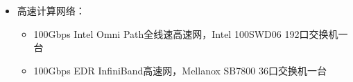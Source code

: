 \documentclass[a4paper,12pt,english]{sphinxmanual}
\begin{document}
\begin{itemize}
\begin{itemize}
\begin{itemize}
\begin{itemize}
\item {} 
\sphinxAtStartPar
64GB DDR4 2400MHz ECC REG内存

\item {} 
\sphinxAtStartPar
两块240GB SSD硬盘

\item {} 
\sphinxAtStartPar
一块100Gbps Intel OFI卡

\item {} 
\sphinxAtStartPar
一块56Gbps FDR InfiniBand卡

\end{itemize}

\end{itemize}

\item {} 
\sphinxAtStartPar
NFS普通IO节点：
\begin{itemize}
\item {} 
\sphinxAtStartPar
节点名：io5

\item {} 
\sphinxAtStartPar
曙光I620\sphinxhyphen{}G20机架式服务器，实际可用空间30TB：
\begin{itemize}
\item {} 
\sphinxAtStartPar
两颗主频2.6GHz的Intel Xeon E5\sphinxhyphen{}2640 v3 x86\_64 8核CPU，共16核

\item {} 
\sphinxAtStartPar
64GB DDR4 2133MHz ECC REG内存

\item {} 
\sphinxAtStartPar
12块4TB 3.5寸7.2K NL\sphinxhyphen{}SAS硬盘

\item {} 
\sphinxAtStartPar
1块2GB Cache RAID卡

\item {} 
\sphinxAtStartPar
1块56Gbps FDR InfiniBand双端口HCA卡

\end{itemize}

\end{itemize}

\end{itemize}

\item {} 
\sphinxAtStartPar
高速计算网络：
\begin{itemize}
\item {} 
\sphinxAtStartPar
100Gbps Intel Omni Path全线速高速网，Intel 100SWD06
192口交换机一台

\item {} 
\sphinxAtStartPar
100Gbps EDR InfiniBand高速网，Mellanox SB7800 36口交换机一台


\end{itemize}
\end{itemize}
\end{document}
